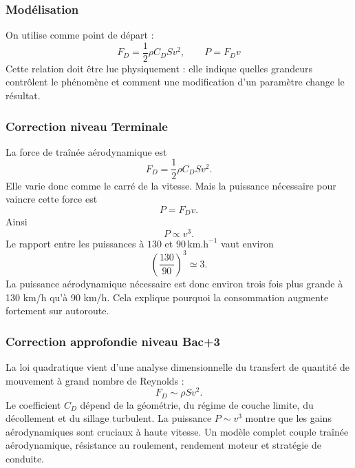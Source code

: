 \documentclass[11pt,a4paper]{article}
\begin{document}
\subsubsection*{Modélisation}

\begin{theorembox}
On utilise comme point de départ :
\[
F_D=\frac12\rho C_DSv^2,\qquad P=F_Dv
\]
Cette relation doit être lue physiquement : elle indique quelles grandeurs contrôlent le phénomène et comment une modification d'un paramètre change le résultat.
\end{theorembox}

\subsubsection*{Correction niveau Terminale}

\begin{corrigebox}

La force de traînée aérodynamique est
\[
F_D=\frac12\rho C_DSv^2.
\]
Elle varie donc comme le carré de la vitesse. Mais la puissance nécessaire pour vaincre cette force est
\[
P=F_Dv.
\]
Ainsi
\[
P\propto v^3.
\]
Le rapport entre les puissances à \(130\) et \(90\,\mathrm{km.h^{-1}}\) vaut environ
\[
\left(\frac{130}{90}\right)^3\simeq3.
\]
La puissance aérodynamique nécessaire est donc environ trois fois plus grande à 130 km/h qu'à 90 km/h. Cela explique pourquoi la consommation augmente fortement sur autoroute.

\end{corrigebox}

\subsubsection*{Correction approfondie niveau Bac+3}

\begin{approfondissementbox}

La loi quadratique vient d'une analyse dimensionnelle du transfert de quantité de mouvement à grand nombre de Reynolds :
\[
F_D\sim \rho S v^2.
\]
Le coefficient \(C_D\) dépend de la géométrie, du régime de couche limite, du décollement et du sillage turbulent. La puissance \(P\sim v^3\) montre que les gains aérodynamiques sont cruciaux à haute vitesse. Un modèle complet couple traînée aérodynamique, résistance au roulement, rendement moteur et stratégie de conduite.

\end{approfondissementbox}
\end{document}
